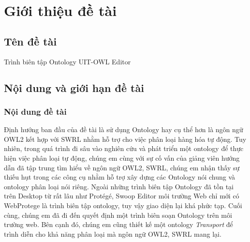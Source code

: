 \chapter {Giới thiệu đề tài}
\section{Tên đề tài}
Trình biên tập Ontology UIT-OWL Editor

\section{Nội dung và giới hạn đề tài}
\subsection{Nội dung đề tài}
Định hướng ban đầu của đề tài là sử dụng Ontology hay cụ thể hơn là ngôn ngữ OWL2 kết hợp với SWRL nhằm hỗ trợ cho việc phân loại hàng hóa tự động. Tuy nhiên, trong quá trình đi sâu vào nghiên cứu và phát triển một ontology để thực hiện việc phân loại tự động, chúng em cùng với sự cố vấn của giảng viên hướng dẫn đã tập trung tìm hiểu về ngôn ngữ OWL2, SWRL, chúng em nhận thấy sự thiếu hụt trong các công cụ nhằm hỗ trợ xây dựng các Ontology nói chung và ontology phân loại nói riêng. Ngoài những trình biên tập Ontology đã tồn tại trên Desktop từ rất lâu như Protégé, Swoop Editor môi trường Web chỉ mới có WebProtege là trình biên tập ontology, tuy vậy giao diện lại khá phức tạp. Cuối cùng, chúng em đã đi đến quyết định một trình biên soạn Ontology trên môi trường web. Bên cạnh đó, chúng em cũng thiết kế một ontology \textit{Transport} \cite{owleditorSrc} để trình diễn cho khả năng phân loại mà ngôn ngữ OWL2, SWRL mang lại.
